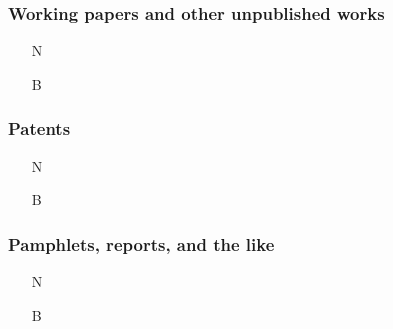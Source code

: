 \documentclass[11pt,letterpaper,oneside]{article}
\begin{document}
\setcounter{subsubsection}{227}
\subsubsection{Working papers and other unpublished works}

\begin{itemize}
\item[N] 

\item[B] 
\end{itemize}

\setcounter{subsubsection}{229}
\subsubsection{Patents}

\begin{itemize}
\item[N] 

\item[B] 
\end{itemize}




\setcounter{subsubsection}{248}
\subsubsection{Pamphlets, reports, and the like}

\begin{itemize}
\item[N] 

\item[B] 
\end{itemize}
\end{document}

